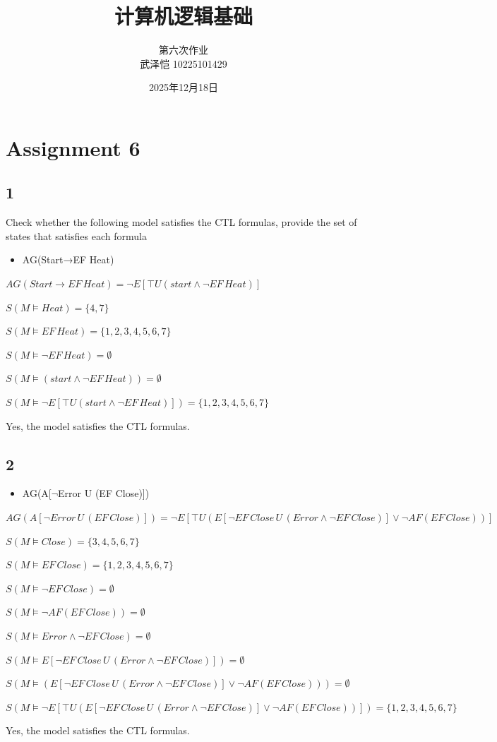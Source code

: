 \documentclass{article}
\title{\heiti\textbf{计算机逻辑基础}}
\author{第六次作业 \\ 
武泽恺 10225101429
}
\date{2025年12月18日}
\begin{document}
\maketitle


\section*{Assignment 6}

\subsection*{1}

Check whether the following model satisfies the CTL formulas, provide the set of states that satisfies each formula
\begin{itemize}
    \item AG(Start→EF Heat)
\end{itemize}

$AG(Start \to EF \, Heat) = \neg E[\top U (start \wedge \neg EF \, Heat)]$

$S(M \vDash Heat) = \{4,7\}$

$S(M \vDash EF \, Heat) = \{1,2,3,4,5,6,7\}$

$S(M \vDash \neg EF \, Heat) = \emptyset$

$S(M \vDash (start \wedge \neg EF \, Heat)) = \emptyset$

$S(M \vDash \neg E[\top U (start \wedge \neg EF \, Heat)]) = \{1,2,3,4,5,6,7\}$

Yes, the model satisfies the CTL formulas.

\subsection*{2}

\begin{itemize}
    \item AG(A[$\neg$Error U (EF Close)])
\end{itemize}

$AG(A[\neg Error \, U \, (EF \, Close)]) = \neg E[\top U (E[\neg EF \, Close \, U \, (Error \wedge \neg EF \, Close)] \vee \neg AF(EF \, Close))]$

$S(M \vDash Close) = \{3, 4, 5, 6, 7\}$

$S(M \vDash EF \, Close) = \{1, 2, 3, 4, 5, 6, 7\}$

$S(M \vDash \neg EF \, Close) = \emptyset$

$S(M \vDash \neg AF(EF \, Close)) = \emptyset$

$S(M \vDash Error \wedge \neg EF \, Close) = \emptyset$

$S(M \vDash E[\neg EF \, Close \, U \, (Error \wedge \neg EF \, Close)]) = \emptyset$

$S(M \vDash (E[\neg EF \, Close \, U \, (Error \wedge \neg EF \, Close)] \vee \neg AF(EF \, Close))) = \emptyset$

$S(M \vDash \neg E[\top U (E[\neg EF \, Close \, U \, (Error \wedge \neg EF \, Close)] \vee \neg AF(EF \, Close))]) = \{1, 2, 3, 4, 5, 6, 7\}$

Yes, the model satisfies the CTL formulas.
\end{document}
